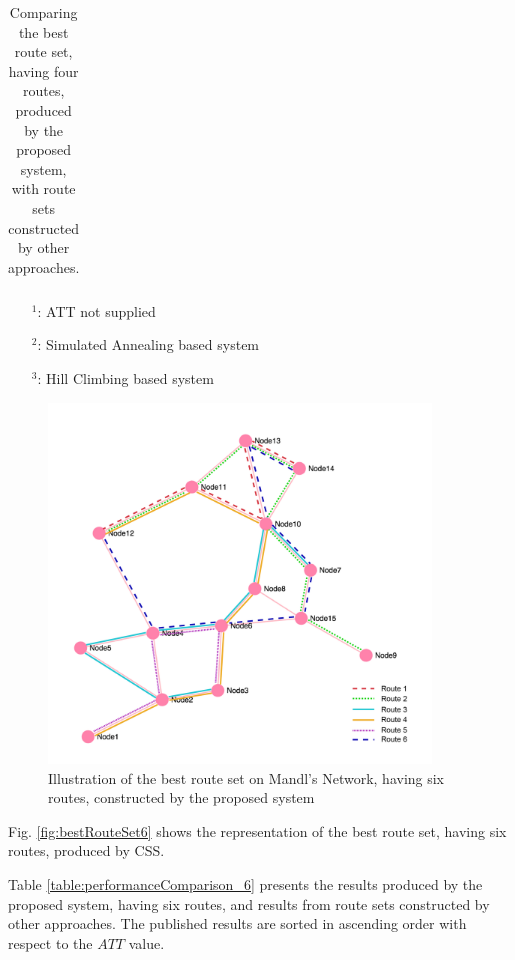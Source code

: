 \begin{table}[H]
\begin{tabular}{|l|l|l|l|l|l|}
    \hline
    \end{tabular}
    \caption {Comparing the best route set, having four routes, produced by the proposed system, with route sets constructed by other approaches.}
    \begin{itemize}[noitemsep]
    \item[$^1$:] ATT not supplied
    \item[$^2$:] Simulated Annealing based system
    \item[$^3$:] Hill Climbing based system
    \end{itemize}
    \label{table:performanceComparison_4}
\end{table}



\begin{figure}[H]
    \begin{center}
    \includegraphics[width=4in]{assets/mandlnetwork_6routes.png}
    \end{center}
    \caption{Illustration of the best route set on Mandl's Network, having six routes, constructed by the proposed system}
    \label{fig:bestRouteSet6} 
\end{figure}

Fig. \vref{fig:bestRouteSet6} shows the representation of the best route set, having six routes, produced by CSS.

Table \vref{table:performanceComparison_6} presents the results produced by the proposed system, having six routes, and results from route sets constructed by other approaches. The published results are sorted in ascending order with respect to the $ATT$ value.

